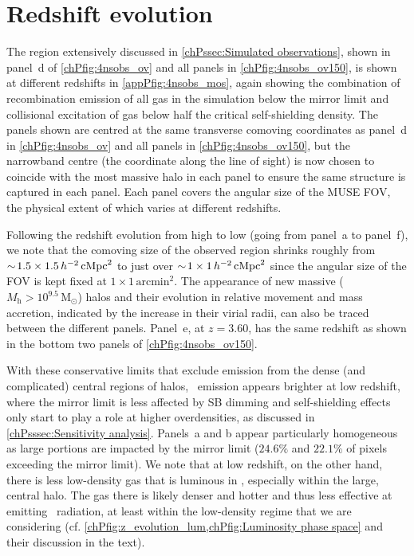 \section{Redshift evolution}
\label{appPsec:Redshift evolution}

The region extensively discussed in \cref{chPssec:Simulated observations}, shown in panel~d of \cref{chPfig:4nsobs_ov} and all panels in \cref{chPfig:4nsobs_ov150}, is shown at different redshifts in \cref{appPfig:4nsobs_mos}, again showing the combination of recombination emission of all gas in the simulation below the mirror limit and collisional excitation of gas below half the critical self-shielding density. The panels shown are centred at the same transverse comoving coordinates as panel~d in \cref{chPfig:4nsobs_ov} and all panels in \cref{chPfig:4nsobs_ov150}, but the narrowband centre (the coordinate along the line of sight) is now chosen to coincide with the most massive halo in each panel to ensure the same structure is captured in each panel. Each panel covers the angular size of the MUSE FOV, the physical extent of which varies at different redshifts.

Following the redshift evolution from high to low (going from panel~a to panel~f), we note that the comoving size of the observed region shrinks roughly from $\sim \! 1.5 \times 1.5 \, h^{-2} \, \mathrm{cMpc}^2$ to just over $\sim \! 1 \times 1 \, h^{-2} \, \mathrm{cMpc}^2$ since the angular size of the FOV is kept fixed at $1 \times 1 \, \mathrm{arcmin}^2$. The appearance of new massive ($M_\mathrm{h} > 10^{9.5} \, \mathrm{M_\odot}$) halos and their evolution in relative movement and mass accretion, indicated by the increase in their virial radii, can also be traced between the different panels. Panel~e, at $z=3.60$, has the same redshift as shown in the bottom two panels of \cref{chPfig:4nsobs_ov150}.

With these conservative limits that exclude emission from the dense (and complicated) central regions of halos, \lya\ emission appears brighter at low redshift, where the mirror limit is less affected by SB dimming and self-shielding effects only start to play a role at higher overdensities, as discussed in \cref{chPsssec:Sensitivity analysis}. Panels~a and b appear particularly homogeneous as large portions are impacted by the mirror limit ($24.6\%$ and $22.1\%$ of pixels exceeding the mirror limit). We note that at low redshift, on the other hand, there is less low-density gas that is luminous in \lya, especially within the large, central halo. The gas there is likely denser and hotter and thus less effective at emitting \lya\ radiation, at least within the low-density regime that we are considering (cf. \cref{chPfig:z_evolution_lum,chPfig:Luminosity phase space} and their discussion in the text).